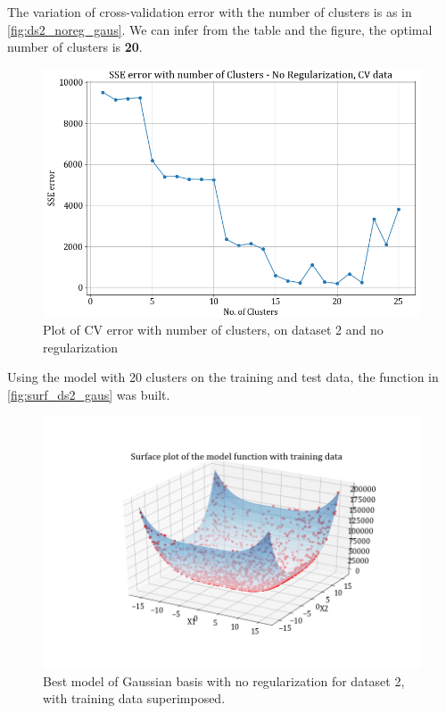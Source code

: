 \documentclass[12pt,a4paper]{article}
\newcommand{\noi}{\noindent}
\begin{document}
\noi
The variation of cross-validation error with the number of clusters is as in \autoref{fig:ds2_noreg_gaus}. We can infer from the table and the figure, the optimal number of clusters is \textbf{20}.
\begin{figure}[H]
    \centering
    \includegraphics[scale = 0.5]{images/errorplot_ds2_no_reg.png}
    \caption{Plot of CV error with number of clusters, on dataset 2 and no regularization}
    \label{fig:ds2_noreg_gaus}
\end{figure}

\noi
Using the model with 20 clusters on the training and test data, the function in \autoref{fig:surf_ds2_gaus} was built. 

\begin{figure}[H]
    \centering
    \includegraphics[scale = 0.5]{images/surface_gaus_ds2_noreg.png}
    \caption{Best model of Gaussian basis with no regularization for dataset 2, with training data superimposed.}
    \label{fig:surf_ds2_gaus}
\end{figure}
\end{document}
